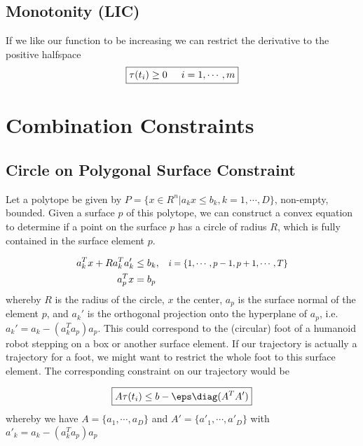 \documentclass{article}
\begin{document}
\subsection{Monotonity (LIC)}

If we like our function to be increasing we can restrict the derivative to the
positive halfspace
\begin{equation}
        \begin{aligned}
                \boxed{\tau(t_i) \geq 0 \hspace{0.5cm}i=1,\cdots,m}
        \end{aligned}
\end{equation}


\section{Combination Constraints}

\subsection{Circle on Polygonal Surface Constraint}

\begin{figure}[h]
\centering
\scalebox{0.6}{}
\end{figure}

Let a polytope be given by $P =\{x\in R^n|a_k x \leq b_k, k=1,\cdots,D\}$,
non-empty, bounded. Given a surface $p$ of this polytope, we can construct a
convex equation to determine if a point on the surface $p$ has a circle of radius $R$, which is fully contained in the surface element $p$. 

\begin{equation}
        \begin{aligned}
                        a_k^T x + R a_k^T a_k'&\leq b_k,&&\scalebox{0.9}{$i=\{1,\cdots,p-1,p+1,\cdots,T\}$}\\
                        a_p^Tx &= b_p\\
        \end{aligned}
\end{equation}
        whereby $R$ is the radius of the circle, $x$ the center, $a_p$ is the surface normal of the element $p$, and $a_k'$ is the
        orthogonal projection onto the hyperplane of $a_p$, i.e. $a_k' = a_k -
        (a_k^Ta_p)a_p$. %
        This could correspond to the (circular) foot of a humanoid robot stepping on a box or another surface element. If our trajectory is actually a trajectory for a foot, we might want to restrict the whole foot to this surface element. The corresponding constraint on our trajectory would be


\begin{equation}
        \begin{aligned}
        \boxed{A \tau(t_i) \leq b - \eps \diag (A^T A')}
        \end{aligned}
\end{equation}
whereby we have $A=\{a_1,\cdots,a_D\}$ and $A'=\{a'_1,\cdots,a'_D\}$ with $a'_k = a_k - (a_k^Ta_p)a_p$












 
\end{document}
